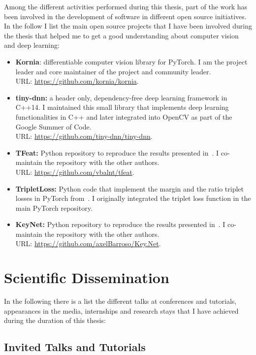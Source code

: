 Among the different activities performed during this thesis, part of the work has been involved in the development of software in different open source initiatives. In the follow I list the main open source projects that I have been involved during the thesis that helped me to get a good understanding about computer vision and deep learning:

\begin{itemize}
\item \textbf{Kornia}: differentiable computer vision library for PyTorch. I am the project leader and core maintainer of the project and community leader.\\
URL: \url{https://github.com/kornia/kornia}.
\item \textbf{tiny-dnn:} a header only, dependency-free deep learning framework in C++14. I maintained this small library that implements deep learning functionalities in C++ and later integrated into OpenCV as part of the Google Summer of Code.\\
URL: \url{https://github.com/tiny-dnn/tiny-dnn}.
\item \textbf{TFeat:} Python repository to reproduce the results presented in~\cite{BalntasBMVC2016}. I co-maintain the repository with the other authors.\\
URL: \url{https://github.com/vbalnt/tfeat}.
\item \textbf{TripletLoss:} Python code that implement the margin and the ratio triplet losses in PyTorch from~\cite{BalntasBMVC2016}. I originally integrated the triplet loss function in the main PyTorch repository.
\item \textbf{KeyNet:} Python repository to reproduce the results presented in~\cite{barroso2019keynet}. I co-maintain the repository with the other authors.\\
URL: \url{https://github.com/axelBarroso/Key.Net}.
\end{itemize}

\section{Scientific Dissemination}

In the following there is a list the different talks at conferences and tutorials, appearances in the media, internships and research stays that I have achieved during the duration of this thesis:

\subsection{Invited Talks and Tutorials}

